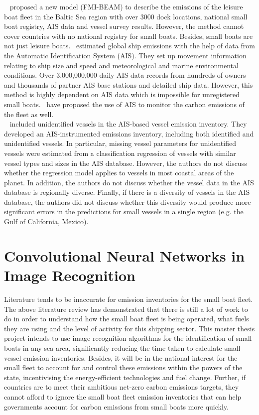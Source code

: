 ~ proposed a new model (FMI-BEAM) to describe the emissions of the leisure boat fleet in the Baltic Sea region with over 3000 dock locations, national small boat registry, AIS data and vessel survey results. However, the method cannot cover countries with no national registry for small boats. Besides, small boats are not just leisure boats.~ estimated global ship emissions with the help of data from the Automatic Identification System (AIS). They set up movement information relating to ship size and speed and meteorological and marine environmental conditions. Over 3,000,000,000 daily AIS data records from hundreds of owners and thousands of partner AIS base stations and detailed ship data. However, this method is highly dependent on AIS data which is impossible for unregistered small boats.~ have proposed the use of AIS to monitor the carbon emissions of the fleet as well.\\

~ included unidentified vessels in the AIS-based vessel emission inventory. They developed an AIS-instrumented emissions inventory, including both identified and unidentified vessels. In particular, missing vessel parameters for unidentified vessels were estimated from a classification regression of vessels with similar vessel types and sizes in the AIS database. However, the authors do not discuss whether the regression model applies to vessels in most coastal areas of the planet. In addition, the authors do not discuss whether the vessel data in the AIS database is regionally diverse. Finally, if there is a diversity of vessels in the AIS database, the authors did not discuss whether this diversity would produce more significant errors in the predictions for small vessels in a single region (e.g. the Gulf of California, Mexico).


\section{Convolutional Neural Networks in Image Recognition}
Literature tends to be inaccurate for emission inventories for the small boat fleet. The above literature review has demonstrated that there is still a lot of work to do in order to understand how the small boat fleet is being operated, what fuels they are using and the level of activity for this shipping sector. This master thesis project intends to use image recognition algorithms for the identification of small boats in any sea area, significantly reducing the time taken to calculate small vessel emission inventories. Besides, it will be in the national interest for the small fleet to account for and control these emissions within the powers of the state, incentivising the energy-efficient technologies and fuel change. Further, if countries are to meet their ambitious net-zero carbon emissions targets, they cannot afford to ignore the small boat fleet emission inventories that can help governments account for carbon emissions from small boats more quickly.\\

